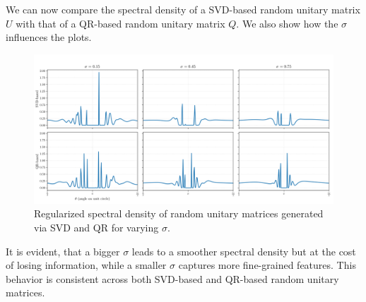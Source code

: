 We can now compare the spectral density of a SVD-based random unitary matrix $U$ with that of a QR-based random unitary matrix $Q$. We also show how the $\sigma$ influences the plots.

\begin{figure}[H]
    \centering
    \includegraphics[width=1\textwidth]{Graphics/compare_svd_qr_spectral_density.png}
    \caption{Regularized spectral density of random unitary matrices generated via SVD and QR for varying $\sigma$.}
    \label{fig:spectral_density_comparison}
\end{figure}

It is evident, that a bigger $\sigma$ leads to a smoother spectral density but at the cost of losing information, while a smaller $\sigma$ captures more fine-grained features. This behavior is consistent across both SVD-based and QR-based random unitary matrices.